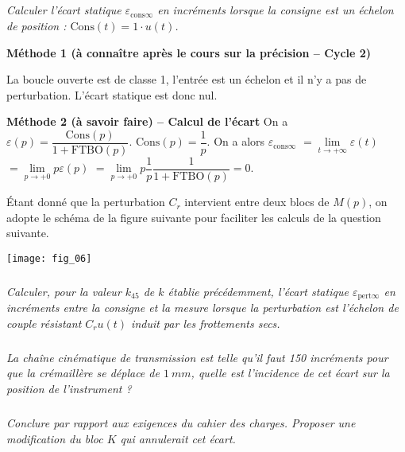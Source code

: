 \begin{multicols}{2}

\subparagraph{}\textit{Calculer%
l’écart statique $\varepsilon_{\text{cons} \infty}$ en incréments lorsque la consigne est un échelon de position : $\text{Cons}(t) = 1\cdot u(t)$.}
\ifprof
\begin{corrige}
\textbf{Méthode 1 (à connaître après le cours sur la précision -- Cycle 2)}

La boucle ouverte est de classe 1, l'entrée est un échelon et il n'y a pas de perturbation. L'écart statique est donc nul.


\textbf{Méthode 2 (à savoir faire) -- Calcul de l'écart}
On a $\varepsilon(p)=\dfrac{\text{Cons}(p)}{1+\text{FTBO}(p)}$. $\text{Cons}(p)=\dfrac{1}{p}$.
On a alors 
$\varepsilon_{\text{cons} \infty} $
$= \lim\limits_{t\to+\infty} \varepsilon(t)$ 
$ = \lim\limits_{p\to+0} p\varepsilon(p)$ 
$ = \lim\limits_{p\to+0} p\dfrac{1}{p}\dfrac{1}{1+\text{FTBO}(p)}=0$.
 



\end{corrige}
\else
\fi


Étant donné que la perturbation $C_r$ intervient entre deux blocs de $M(p)$, on adopte le schéma de la 
figure suivante pour faciliter les calculs de la question suivante. 

\begin{center}
\texttt{[image: fig\_06]}
\end{center}


\subparagraph{}\textit{Calculer, pour la valeur $k_{45}$ de $k$ établie précédemment, l’écart statique $\varepsilon_{\text{pert} \infty}$ en incréments entre la consigne et la mesure lorsque la perturbation est l’échelon de couple résistant $C_r u(t)$ induit par les frottements secs. }
\ifprof
\begin{corrige}
\end{corrige}
\else
\fi


\subparagraph{}\textit{La chaîne cinématique de transmission est telle qu’il faut 150 incréments pour que la crémaillère se déplace de $\SI{1}{mm}$, quelle est l’incidence de cet écart sur la position de l’instrument ? }
\ifprof
\begin{corrige}
\end{corrige}
\else
\fi


\subparagraph{}\textit{Conclure par rapport aux exigences du cahier des charges.
Proposer une modification du bloc $K$ qui annulerait cet écart.}
\ifprof
\begin{corrige}
\end{corrige}
\else
\fi


\end{multicols}
